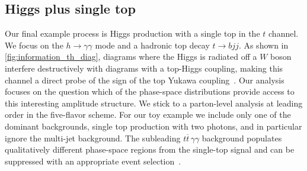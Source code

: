 \subsection{Higgs plus single top}
\label{sec:information_th}

Our final example process
is Higgs production with a single top in the $t$ channel. We focus on
the $h \to \gamma \gamma$ mode and a hadronic top decay $t \to b
jj$.
As shown in \autoref{fig:information_th_diag}, diagrams where the
Higgs is radiated off a $W$ boson interfere destructively with
diagrams with a top-Higgs coupling, making this channel a direct probe
of the sign of the top Yukawa coupling~\cite{Maltoni:2001hu}. Our
analysis focuses on the question which of the phase-space
distributions provide access to this interesting amplitude
structure. We stick to a parton-level analysis at leading order in the
five-flavor scheme. For our toy example we include only one of the
dominant backgrounds, single top production with two photons, and in
particular ignore the multi-jet background. The subleading
$t\overbar{t} \, \gamma\gamma$ background populates qualitatively
different phase-space regions from the single-top signal and can be
suppressed with an appropriate event selection~\cite{Kling:2012up}.

